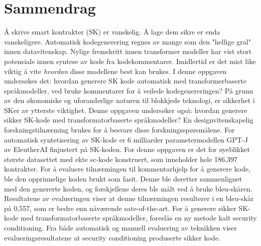 \chapter*{Sammendrag}
Å skrive smart kontrakter (SK) er vanskelig. Å lage dem sikre er enda vanskeligere. Automatisk kodegenerering regnes av mange som den "hellige gral" innen datavitenskap. Nylige fremskritt innen transformer modeller har vist stort potensiale innen syntese av kode fra kodekommentarer. Imidlertid er det mist like viktig å vite \textit{hvordan} disse modellene best kan brukes. I denne oppgaven undersøkes det: hvordan generere SK kode automatisk med transformerbaserte språkmodeller, ved bruke kommentarer for å veilede kodegenereringen? På grunn av den økonomiske og uforanderlige naturen til blokkjede teknologi, er sikkerhet i SKer av ytterste viktighet. Denne oppgaven undersøker også: hvordan generere sikker SK-kode med transformatorbaserte språkmodeller? En designvitenskapelig forskningstilnærming brukes for å besvare disse forskningsspørsmålene. For automatisk syntetisering av SK-kode er 6 milliarder parametermodellen GPT-J av EleutherAI finjustert på SK-koden. For denne oppgaven er det for øyeblikket største datasettet med ekte \acrshort{sc}-kode konstruert, som inneholder hele 186,397 kontrakter. For å evaluere tilnærmingen til kommentarhjelp for å generere kode, ble den opprinnelige koden brukt som fasit. Denne ble deretter sammenlignet med den genererte koden, og forskjellene deres ble målt ved å bruke \acrfull{bleu}-skåren. Resultatene av evalueringen viser at denne tilnærmingen resulterer i en \acrshort{bleu}-skår på 0,557, som er bedre enn nåværende sate-of-the-art. For å generere sikker SK-kode med transformatorbaserte språkmodeller, foreslås en ny metode kalt security conditioning. Fra både automatisk og manuell evaluering av teknikken viser evalueringsresultatene at security conditioning produserte sikker kode.

